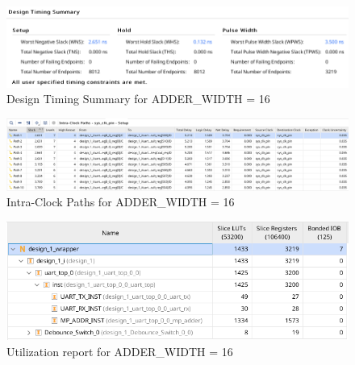 \documentclass[a4paper,kul]{kulakarticle} %
\begin{document}
\begin{figure}[h]
	\centering
	\includegraphics[width=0.75\linewidth]{images/timing-16-bit.png}
	\caption{Design Timing Summary for ADDER\_WIDTH = 16}
	\label{fig:timing-16-bit}
\end{figure}

\begin{figure}[h]
	\centering
	\includegraphics[width=0.75\linewidth]{images/paths-16-bit.png}
	\caption{Intra-Clock Paths for ADDER\_WIDTH = 16}
	\label{fig:paths-16-bit}
\end{figure}

\begin{figure}[h]
	\centering
	\includegraphics[width=0.75\linewidth]{images/utilization-16-bit.png}
	\caption{Utilization report for ADDER\_WIDTH = 16}
	\label{fig:utilization-16-bit}
\end{figure}
\end{document}
